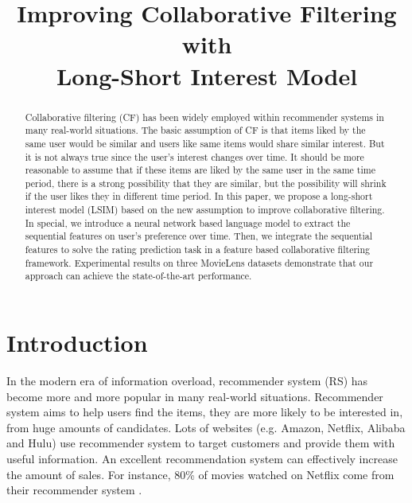 \documentclass{sig-alternate-05-2015}
\begin{document}

\title{Improving Collaborative Filtering with\\
Long-Short Interest Model}


\maketitle

\begin{abstract}
Collaborative filtering (CF) has been widely employed within
recommender systems in many real-world situations.
The basic assumption of CF is that items liked by the same user would be similar and
users like same items would share similar interest.
But it is not always true since the user's interest changes over time.
It should be more reasonable to assume that
if these items are liked by the same user in the same time period,
there is a strong possibility that they are similar,
but the possibility will shrink if the user likes they in different time period.
In this paper, we propose a long-short interest model (LSIM) based on
the new assumption to improve collaborative filtering.
In special, we introduce a neural network based language model
to extract the sequential features on user's preference over time.
Then, we integrate the sequential features to solve the rating prediction task
in a feature based collaborative filtering framework.
Experimental results on three MovieLens datasets demonstrate that
our approach can achieve the state-of-the-art performance.
\end{abstract}


\section{Introduction}
In the modern era of information overload,
recommender system (RS) has become more and more popular in many real-world situations.
Recommender system aims to help users find the items,
they are more likely to be interested in,
from huge amounts of candidates.
Lots of websites (e.g. Amazon, Netflix, Alibaba and Hulu) use recommender system to
target customers and provide them with useful information.
An excellent recommendation system can effectively increase the amount of sales.
For instance, 80\% of movies watched on Netflix
come from their recommender system \cite{gomez2015netflix}.
\end{document}
